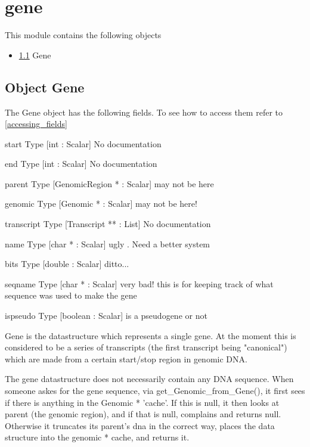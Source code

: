 \section{gene}
\label{module_gene}
This module contains the following objects

\begin{itemize}
\item \ref{object_Gene} Gene

\end{itemize}
\subsection{Object Gene}

\label{object_Gene}

The Gene object has the following fields. To see how to access them refer to \ref{accessing_fields}
\begin{description}
\item{start} Type [int : Scalar] No documentation

\item{end} Type [int : Scalar] No documentation

\item{parent} Type [GenomicRegion * : Scalar]  may not be here

\item{genomic} Type [Genomic * : Scalar]  may not be here!

\item{transcript} Type [Transcript ** : List] No documentation

\item{name} Type [char * : Scalar]  ugly . Need a better system

\item{bits} Type [double : Scalar]  ditto...

\item{seqname} Type [char * : Scalar]  very bad! this is for keeping track of what sequence was used to make the gene

\item{ispseudo} Type [boolean : Scalar]  is a pseudogene or not

\end{description}
Gene is the datastructure which represents a single
gene. At the moment this is considered to be a series
of transcripts (the first transcript being "canonical")
which are made from a certain start/stop region in
genomic DNA.


The gene datastructure does not necessarily contain
any DNA sequence. When someone askes for the gene sequence,
via get_Genomic_from_Gene(), it first sees if there
is anything in the Genomic * 'cache'. If this is null,
it then looks at parent (the genomic region), and if
that is null, complains and returns null. Otherwise it
truncates its parent's dna in the correct way, places
the data structure into the genomic * cache, and returns
it.



